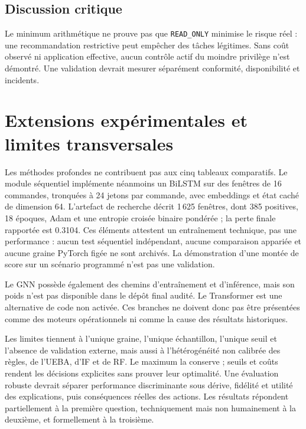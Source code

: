 \documentclass[11pt,a4paper,oneside]{report}
\theoremstyle{definition}
\theoremstyle{plain}
\begin{document}
\subsection*{Discussion critique}

Le minimum arithmétique ne prouve pas que \texttt{READ\_ONLY} minimise le risque réel : une recommandation restrictive peut empêcher des tâches légitimes. Sans coût observé ni application effective, aucun contrôle actif du moindre privilège n'est démontré. Une validation devrait mesurer séparément conformité, disponibilité et incidents.

\section{Extensions expérimentales et limites transversales}
\label{sec:ai-ro-extensions}

Les méthodes profondes ne contribuent pas aux cinq tableaux comparatifs. Le
module séquentiel implémente néanmoins un BiLSTM sur des fenêtres de
16 commandes, tronquées à 24 jetons par commande, avec embeddings et état
caché de dimension 64. L'artefact de recherche décrit 1\,625 fenêtres, dont
385 positives, 18 époques, Adam et une entropie croisée binaire pondérée ; la
perte finale rapportée est 0.3104. Ces éléments attestent un entraînement
technique, pas une performance : aucun test séquentiel indépendant, aucune
comparaison appariée et aucune graine PyTorch figée ne sont archivés. La
démonstration d'une montée de score sur un scénario programmé n'est pas une
validation.

Le GNN possède également des chemins d'entraînement et d'inférence, mais son
poids n'est pas disponible dans le dépôt final audité. Le Transformer est une
alternative de code non activée. Ces branches ne doivent donc pas être
présentées comme des moteurs opérationnels ni comme la cause des résultats
historiques.

Les limites tiennent à l'unique graine, l'unique échantillon, l'unique seuil et l'absence de validation externe, mais aussi à l'hétérogénéité non calibrée des règles, de l'UEBA, d'IF et de RF. Le maximum la conserve ; seuils et coûts rendent les décisions explicites sans prouver leur optimalité. Une évaluation robuste devrait séparer performance discriminante sous dérive, fidélité et utilité des explications, puis conséquences réelles des actions. Les résultats répondent partiellement à la première question, techniquement mais non humainement à la deuxième, et formellement à la troisième.
\end{document}

